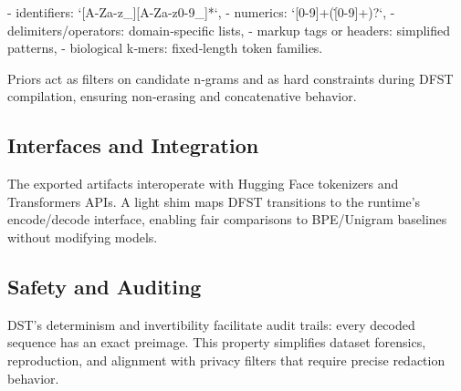 - identifiers: `[A-Za-z_][A-Za-z0-9_]*`,
- numerics: `[0-9]+(\.[0-9]+)?`,
- delimiters/operators: domain‑specific lists,
- markup tags or headers: simplified patterns,
- biological k‑mers: fixed‑length token families.

Priors act as filters on candidate n‑grams and as hard constraints during DFST compilation, ensuring non‑erasing and concatenative behavior.

\subsection{Interfaces and Integration}

The exported artifacts interoperate with Hugging Face tokenizers and Transformers APIs. A light shim maps DFST transitions to the runtime’s encode/decode interface, enabling fair comparisons to BPE/Unigram baselines without modifying models.

\subsection{Safety and Auditing}

DST’s determinism and invertibility facilitate audit trails: every decoded sequence has an exact preimage. This property simplifies dataset forensics, reproduction, and alignment with privacy filters that require precise redaction behavior.
